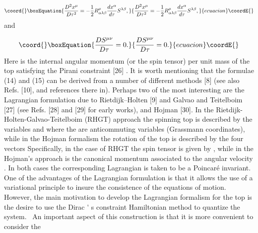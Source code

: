 \documentclass[a4paper,12pt]{article}
\begin{document}
\begin{equation}\coord{}\boxEquation{
\frac{D^{2}x^{\mu}}{D\tau^{2}}=-\frac{1}{2}R_{\alpha\lambda\beta}^{\mu}\frac{
dx^{\alpha}}{d\tau}S^{\lambda\beta},  \label{14}
}{
\frac{D^{2}x^{\mu}}{D\tau^{2}}=-\frac{1}{2}R_{\alpha\lambda\beta}^{\mu}\frac{
dx^{\alpha}}{d\tau}S^{\lambda\beta},  }{ecuacion}\coordE{}\end{equation}
and

\begin{equation}\coord{}\boxEquation{
\frac{DS^{\mu \nu }}{D\tau }=0.  \label{15}
}{
\frac{DS^{\mu \nu }}{D\tau }=0.  }{ecuacion}\coordE{}\end{equation}
Here \coordHE{} is the internal angular momentum (or the
spin tensor) per unit mass of the top satisfying the Pirani constraint [26] \coordHE{}. It is worth mentioning that the
formulae (14) and (15) can be derived from a number of different methods [8]
(see also Refs. [10], and references there in). Perhaps two of the most
interesting are the Lagrangian formulation due to Rietdijk--Holten [9] and
Galvao and Teitelboim [27] (see Refs. [28] and [29] for early works), and
Hojman [30]. In the Rietdijk-Holten-Galvao-Teitelboim (RHGT) approach the
spinning top is described by the variables \coordHE{} and \myHighlight{$\theta
^{\mu }(\tau ),$}\coordHE{} where the \myHighlight{$\theta ^{\mu }(\tau )$}\coordHE{} are anticommuting
variables (Grassmann coordinates), while in the Hojman formalism the
rotation of the top is described by the four vectors \coordHE{} Specifically, in the case of RHGT the spin tensor \coordHE{}
is given by \coordHE{}, while in the
Hojman's approach \coordHE{} is the canonical momentum associated to the
angular velocity \coordHE{}. In both cases the corresponding Lagrangian is taken
to be a Poincar\'{e} invariant. One of the advantages of the Lagrangian
formulation is that it allows the use of a variational principle to insure
the consistence of the equations of motion. However, the main motivation to
develop the Lagrangian formalism for the top is the desire to use the Dirac%
\'{}%
s constraint Hamiltonian method to quantize the system. \ An important
aspect of this construction is that it is more convenient to consider the
\end{document}
